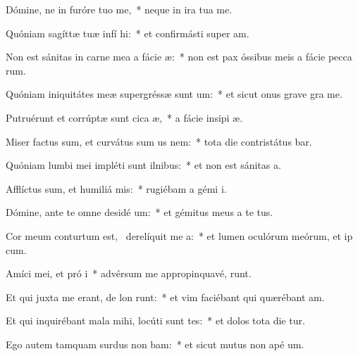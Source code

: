 \item Dómine, ne in furóre tuo  me,~* neque in ira tua  me.
\item Quóniam sagíttæ tuæ infí  hi:~* et confirmásti super   am.
\item Non est sánitas in carne mea a fácie  æ:~* non est pax óssibus meis a fácie pecca rum.
\item Quóniam iniquitátes meæ supergréssæ sunt  um:~* et sicut onus grave gra   me.
\item Putruérunt et corrúptæ sunt cica æ,~* a fácie insipi æ.
\item Miser factus sum, et curvátus sum us  nem:~* tota die contristátus bar.
\item Quóniam lumbi mei impléti sunt ilnibus:~* et non est sánitas   a.
\item Afflíctus sum, et humiliá  mis:~* rugiébam a gémi  i.
\item Dómine, ante te omne desidé um:~* et gémitus meus a te   tus.
\item Cor meum conturtum est,~\pscross{} derelíquit me  a:~* et lumen oculórum meórum, et ip   cum.
\item Amíci mei, et pró i~* advérsum me appropinquavé,  runt.
\item Et qui juxta me erant, de lon runt:~* et vim faciébant qui quærébant  am.
\item Et qui inquirébant mala mihi, locúti sunt tes:~* et dolos tota die tur.
\item Ego autem tamquam surdus non bam:~* et sicut mutus non apé  um.
